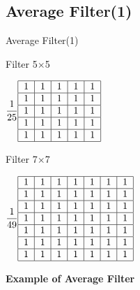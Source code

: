 \documentclass{beamer}
\begin{document}
\subsection{Average Filter(1)}
\begin{frame}{Average Filter(1)}
\begin{center}
	Filter 5$\times$5
	
	$\dfrac{1}{25}\begin{tabular}{|c|c|c|c|c|}
	\hline 
	1 & 1 & 1 & 1 & 1 \\ 
	\hline 
	1 & 1 & 1 & 1 & 1 \\ 
	\hline 
	1 & 1 & 1 & 1 & 1 \\ 
	\hline 
	1 & 1 & 1 & 1 & 1 \\ 
	\hline 
	1 & 1 & 1 & 1 & 1 \\ 
	\hline 
	\end{tabular} $
\end{center}





\begin{center}
	Filter 7$\times$7
	
	$\dfrac{1}{49}\begin{tabular}{|c|c|c|c|c|c|c|}
	\hline 
	1 & 1 & 1 & 1 & 1 & 1 & 1 \\ 
	\hline 
	1 & 1 & 1 & 1 & 1 & 1 & 1 \\ 
	\hline 
	1 & 1 & 1 & 1 & 1 & 1 & 1 \\ 
	\hline 
	1 & 1 & 1 & 1 & 1 & 1 & 1 \\ 
	\hline 
	1 & 1 & 1 & 1 & 1 & 1 & 1 \\ 
	\hline 
	1 & 1 & 1 & 1 & 1 & 1 & 1 \\ 
	\hline 
	1 & 1 & 1 & 1 & 1 & 1 & 1 \\ 
	\hline 
	\end{tabular} $
\vspace{0.3cm}

\textbf{Example of Average Filter}
\end{center}


\end{frame}
\end{document}
